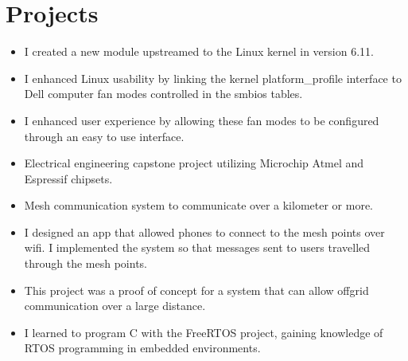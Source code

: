 \documentclass{lsanche_cv}
\begin{document}

\section{Projects}

		\begin{itemize}
			\item I created a new module upstreamed to the Linux kernel in version 6.11.
			\item I enhanced Linux usability by linking the kernel platform\_profile interface to Dell computer fan modes controlled in the smbios tables.
      \item I enhanced user experience by allowing these fan modes to be configured through an easy to use interface.
		\end{itemize}

	\divider

\begin{itemize}
\item Electrical engineering capstone project utilizing Microchip Atmel and Espressif chipsets.
\item Mesh communication system to communicate over a kilometer or more. 
\item I designed an app that allowed phones to connect to the mesh points over wifi. I implemented the system so that messages sent to users travelled through the mesh points.
\item This project was a proof of concept for a system that can allow offgrid communication over a large distance.
\item I learned to program C with the FreeRTOS project, gaining knowledge of RTOS programming in embedded environments.
\end{itemize}

\divider
\end{document}
